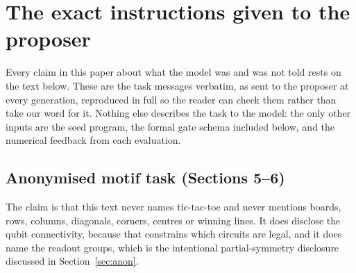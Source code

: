 \appendix
\section{The exact instructions given to the proposer}
\label{app:prompts}

Every claim in this paper about what the model was and was not told rests on the
text below. These are the task messages verbatim, as sent to the proposer at
every generation, reproduced in full so the reader can check them rather than
take our word for it. Nothing else describes the task to the model: the only
other inputs are the seed program, the formal gate schema included below, and the
numerical feedback from each evaluation.

\subsection{Anonymised motif task (Sections 5--6)}

The claim is that this text never names tic-tac-toe and never mentions boards,
rows, columns, diagonals, corners, centres or winning lines. It does disclose the
qubit connectivity, because that constrains which circuits are legal, and it does
name the readout groups, which is the intentional partial-symmetry disclosure
discussed in Section~\ref{sec:anon}.

